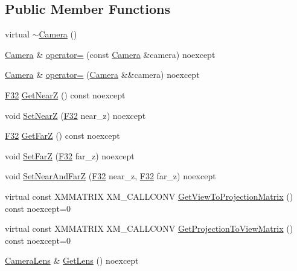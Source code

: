 \subsection*{Public Member Functions}
\begin{DoxyCompactItemize}
\item 
virtual \hyperlink{classmage_1_1_camera_aa4718c93578d160299bdc24039cc256f}{$\sim$\+Camera} ()
\item 
\hyperlink{classmage_1_1_camera}{Camera} \& \hyperlink{classmage_1_1_camera_a785b5e3a62922f7a687ffcaecd0ef89c}{operator=} (const \hyperlink{classmage_1_1_camera}{Camera} \&camera) noexcept
\item 
\hyperlink{classmage_1_1_camera}{Camera} \& \hyperlink{classmage_1_1_camera_ac52101822e004915a96150305564a6bf}{operator=} (\hyperlink{classmage_1_1_camera}{Camera} \&\&camera) noexcept
\item 
\hyperlink{namespacemage_aa97e833b45f06d60a0a9c4fc22ae02c0}{F32} \hyperlink{classmage_1_1_camera_add4054d66911dd183cdec85eda77b4a1}{Get\+NearZ} () const noexcept
\item 
void \hyperlink{classmage_1_1_camera_a404c336596263f7b55f4ff2e5097f8e9}{Set\+NearZ} (\hyperlink{namespacemage_aa97e833b45f06d60a0a9c4fc22ae02c0}{F32} near\+\_\+z) noexcept
\item 
\hyperlink{namespacemage_aa97e833b45f06d60a0a9c4fc22ae02c0}{F32} \hyperlink{classmage_1_1_camera_a47e6801d228891453540b0c1e787724a}{Get\+FarZ} () const noexcept
\item 
void \hyperlink{classmage_1_1_camera_aa49995ef824eeb807656921406d248a5}{Set\+FarZ} (\hyperlink{namespacemage_aa97e833b45f06d60a0a9c4fc22ae02c0}{F32} far\+\_\+z) noexcept
\item 
void \hyperlink{classmage_1_1_camera_aa075b0f6f30376217c0058a70df9d845}{Set\+Near\+And\+FarZ} (\hyperlink{namespacemage_aa97e833b45f06d60a0a9c4fc22ae02c0}{F32} near\+\_\+z, \hyperlink{namespacemage_aa97e833b45f06d60a0a9c4fc22ae02c0}{F32} far\+\_\+z) noexcept
\item 
virtual const X\+M\+M\+A\+T\+R\+IX X\+M\+\_\+\+C\+A\+L\+L\+C\+O\+NV \hyperlink{classmage_1_1_camera_a716d842481321b8b4d71da45ab77a7c9}{Get\+View\+To\+Projection\+Matrix} () const noexcept=0
\item 
virtual const X\+M\+M\+A\+T\+R\+IX X\+M\+\_\+\+C\+A\+L\+L\+C\+O\+NV \hyperlink{classmage_1_1_camera_a9259dee9eeee754a1392cca88f428d29}{Get\+Projection\+To\+View\+Matrix} () const noexcept=0
\item 
\hyperlink{classmage_1_1_camera_lens}{Camera\+Lens} \& \hyperlink{classmage_1_1_camera_ac9c78f262c8cea00c8887afe39625249}{Get\+Lens} () noexcept

\end{DoxyCompactItemize}
